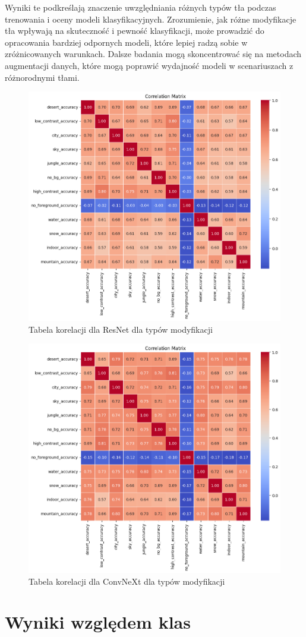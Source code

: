 Wyniki te podkreślają znaczenie uwzględniania różnych typów tła podczas trenowania i oceny modeli klasyfikacyjnych. Zrozumienie, jak różne 
modyfikacje tła wpływają na skuteczność i pewność klasyfikacji, może prowadzić do opracowania bardziej odpornych modeli, które lepiej radzą 
sobie w zróżnicowanych warunkach. Dalsze badania mogą skoncentrować się na metodach augmentacji danych, które mogą poprawić wydajność modeli w 
scenariuszach z różnorodnymi tłami.
\begin{figure}
	\centering\includegraphics[width=.9\textwidth]{img/korelacja_resnet_typ}
	\caption{Tabela korelacji dla ResNet dla typów modyfikacji}  
    \label{rys:corelation_resnet_type}
\end{figure}

\begin{figure}
	\centering\includegraphics[width=.9\textwidth]{img/korelacja_convnext_typ}
	\caption{Tabela korelacji dla ConvNeXt dla typów modyfikacji}  
    \label{rys:corelation_convnext_type}
\end{figure}

\section*{Wyniki względem klas}